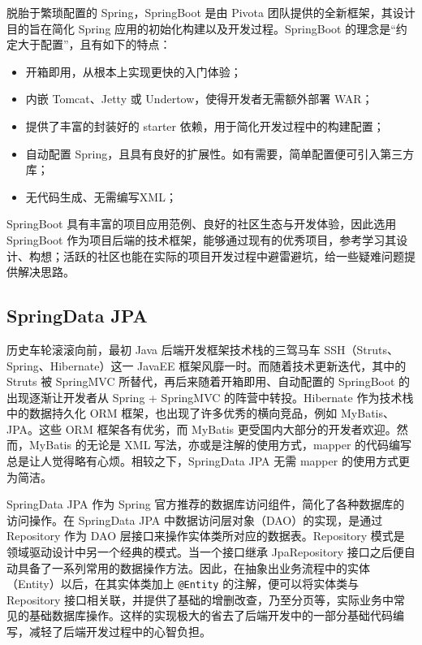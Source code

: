 脱胎于繁琐配置的 Spring，SpringBoot 是由 Pivota 团队提供的全新框架，其设计目的旨在简化 Spring 应用的初始化构建以及开发过程。SpringBoot 的理念是“约定大于配置”，且有如下的特点：
\begin{itemize}
    \item 开箱即用，从根本上实现更快的入门体验；
    \item 内嵌 Tomcat、Jetty 或 Undertow，使得开发者无需额外部署 WAR；
    \item 提供了丰富的封装好的 starter 依赖，用于简化开发过程中的构建配置；
    \item 自动配置 Spring，且具有良好的扩展性。如有需要，简单配置便可引入第三方库；
    \item 无代码生成、无需编写XML；
\end{itemize}

SpringBoot 具有丰富的项目应用范例、良好的社区生态与开发体验，因此选用 SpringBoot 作为项目后端的技术框架，能够通过现有的优秀项目，参考学习其设计、构想；活跃的社区也能在实际的项目开发过程中避雷避坑，给一些疑难问题提供解决思路。

\subsection{SpringData JPA}
历史车轮滚滚向前，最初 Java 后端开发框架技术栈的三驾马车 SSH（Struts、Spring、Hibernate）这一 JavaEE 框架风靡一时。而随着技术更新迭代，其中的 Struts 被 SpringMVC 所替代，再后来随着开箱即用、自动配置的 SpringBoot 的出现逐渐让开发者从 Spring + SpringMVC 的阵营中转投。Hibernate 作为技术栈中的数据持久化 ORM 框架，也出现了许多优秀的横向竞品，例如 MyBatis、JPA。这些 ORM 框架各有优劣，而 MyBatis 更受国内大部分的开发者欢迎。然而，MyBatis 的无论是 XML 写法，亦或是注解的使用方式，mapper 的代码编写总是让人觉得略有心烦。相较之下，SpringData JPA 无需 mapper 的使用方式更为简洁。

SpringData JPA 作为 Spring 官方推荐的数据库访问组件，简化了各种数据库的访问操作。在 SpringData JPA 中数据访问层对象（DAO）的实现，是通过 Repository 作为 DAO 层接口来操作实体类所对应的数据表。Repository 模式是领域驱动设计中另一个经典的模式。当一个接口继承 JpaRepository 接口之后便自动具备了一系列常用的数据操作方法。因此，在抽象出业务流程中的实体（Entity）以后，在其实体类加上  \lstinline!@Entity! 的注解，便可以将实体类与 Repository 接口相关联，并提供了基础的增删改查，乃至分页等，实际业务中常见的基础数据库操作。这样的实现极大的省去了后端开发中的一部分基础代码编写，减轻了后端开发过程中的心智负担。

